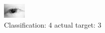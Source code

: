 \begin{figure}[h!]
\begin{center}
\includegraphics[width=0.60\columnwidth]{figures/ID33_class_4_target_3.png}
\end{center}
\caption{ Classification: 4 actual target: 3}
\label{fig:ID33_class_4_target_3}
\end{figure}
